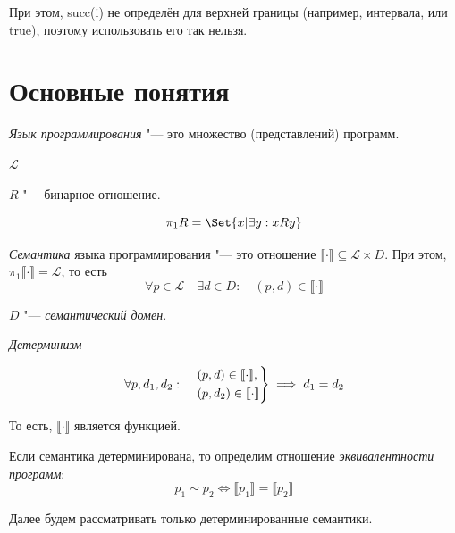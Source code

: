 При этом, succ(i) не определён для верхней границы (например, интервала, или true), поэтому
использовать его так нельзя.

\section{Основные понятия}

\begin{definition}
	\emph{Язык программирования} "--- это множество (представлений) программ.
\end{definition}

\begin{notation}
	$ \mathscr L $
\end{notation}

\begin{definition}
	$ R $ "--- бинарное отношение.

	$$ \pi_1 R = \Set{x | \exists y : x R y} $$
\end{definition}

\begin{definition}
	\emph{Семантика} языка программирования "--- это отношение
	$ \llbracket \cdot \rrbracket \subseteq \mathscr L
	\times D $.
	При этом, $ \pi_1 \llbracket \cdot \rrbracket = \mathscr L $, то есть
	$$ \forall p \in \mathscr L \quad \exists d \in D : \quad (p, d) \in \llbracket\cdot\rrbracket $$

	$ D $ "--- \emph{семантический домен}.
\end{definition}

\begin{definition}
	\emph{Детерминизм}

	$$ \forall p, d_1, d_2 : \quad
	\begin{rcases}
		(p, d) \in \llbracket\cdot\rrbracket, \\
		(p, d_2) \in \llbracket\cdot\rrbracket
	\end{rcases} \implies d_1 = d_2 $$

	То есть, $ \llbracket\cdot\rrbracket $ является функцией.
\end{definition}

\begin{definition}
	Если семантика детерминирована, то определим отношение \emph{эквивалентности программ}:
	$$ p_1 \sim p_2 \iff \llbracket p_1\rrbracket = \llbracket p_2\rrbracket $$
\end{definition}

Далее будем рассматривать только детерминированные семантики.


